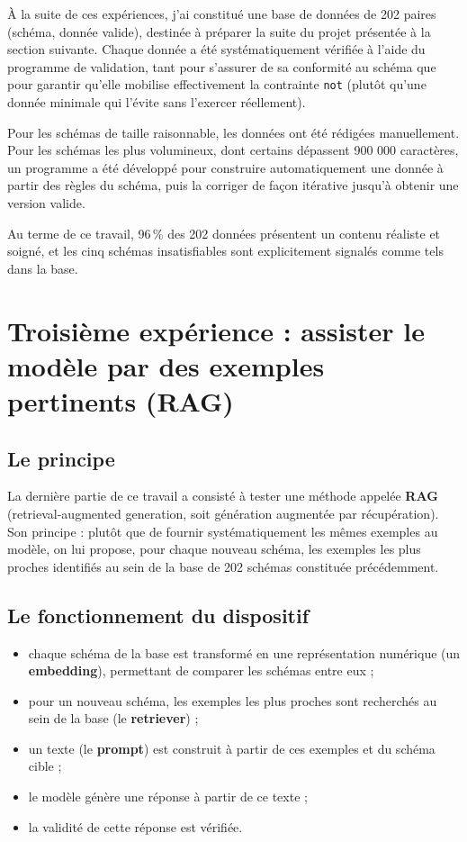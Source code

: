 \documentclass[11pt,a4paper]{article}
\begin{document}
À la suite de ces expériences, j'ai constitué une base de données de 202 paires (schéma, donnée valide), destinée à préparer la suite du projet présentée à la section suivante. Chaque donnée a été systématiquement vérifiée à l'aide du programme de validation, tant pour s'assurer de sa conformité au schéma que pour garantir qu'elle mobilise effectivement la contrainte \texttt{not} (plutôt qu'une donnée minimale qui l'évite sans l'exercer réellement).

Pour les schémas de taille raisonnable, les données ont été rédigées manuellement. Pour les schémas les plus volumineux, dont certains dépassent 900 000 caractères, un programme a été développé pour construire automatiquement une donnée à partir des règles du schéma, puis la corriger de façon itérative jusqu'à obtenir une version valide.

Au terme de ce travail, 96\,\% des 202 données présentent un contenu réaliste et soigné, et les cinq schémas insatisfiables sont explicitement signalés comme tels dans la base.

\section{Troisième expérience : assister le modèle par des exemples pertinents (RAG)}

\subsection{Le principe}

La dernière partie de ce travail a consisté à tester une méthode appelée \textbf{RAG} (retrieval-augmented generation, soit génération augmentée par récupération). Son principe : plutôt que de fournir systématiquement les mêmes exemples au modèle, on lui propose, pour chaque nouveau schéma, les exemples les plus proches identifiés au sein de la base de 202 schémas constituée précédemment.

\subsection{Le fonctionnement du dispositif}

\begin{itemize}
    \item chaque schéma de la base est transformé en une représentation numérique (un \textbf{embedding}), permettant de comparer les schémas entre eux ;
    \item pour un nouveau schéma, les exemples les plus proches sont recherchés au sein de la base (le \textbf{retriever}) ;
    \item un texte (le \textbf{prompt}) est construit à partir de ces exemples et du schéma cible ;
    \item le modèle génère une réponse à partir de ce texte ;
    \item la validité de cette réponse est vérifiée.
\end{itemize}
\end{document}
